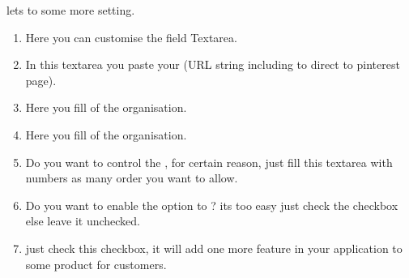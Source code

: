 \documentclass[a4paper,10pt,english]{report}
\begin{document}
lets to some more setting.
\begin{enumerate}
\def\theenumi{\arabic{enumi}}
\def\labelenumi{\theenumi .}
\makeatletter\def\p@enumii{\p@enumi \theenumi .}\makeatother
\setcounter{enumi}{19}
\item {} 
Here you can customise the  field Textarea.

\item {} 
In this textarea you paste your  (URL string including  to direct to pinterest page).

\item {} 
Here you fill  of the organisation.

\item {} 
Here you fill  of the organisation.

\item {} 
Do you want to control the , for certain reason, just fill this textarea with numbers as many order you want to allow.

\item {} 
Do you want to enable the option to  ? its too easy just check the checkbox else leave it unchecked.

\item {} 
just check this checkbox, it will add one more feature in your application to  some product for customers.

\end{enumerate}
\end{document}
